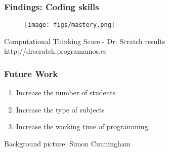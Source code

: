 \documentclass{beamer}
\begin{document}
\begin{frame}
\frametitle{Findings: Coding skills}

\begin{figure}[t!]
\begin{center}
\texttt{[image: figs/mastery.png]}
\end{center}
\label{fig:naming}
\end{figure}

\begin{center}
Computational Thinking Score - Dr. Scratch results 
http://drscratch.programamos.es
\end{center}
\end{frame}


\begin{frame}
\frametitle{Future Work}

\begin{enumerate}
  \item Increase the number of students
  \item Increase the type of subjects 
  \item Increase the working time of programming
\end{enumerate}
\vspace{\baselineskip}
\vspace{\baselineskip}
\hfill{\Tiny Background picture: Simon Cunningham }

\end{frame}



\end{document}
